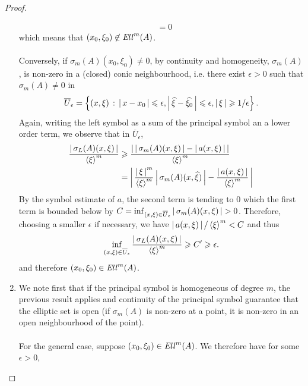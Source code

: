 \documentclass[12pt]{article}
\begin{document}
\begin{proof}
\begin{enumerate}
\begin{align*}
            & = 0
        \end{align*}
        which means that $(x_0, \xi_0) \not \in \Ell^m(A)$. \\
        \\
        Conversely, if $\sigma_m(A)(x_0, \xi_0) \neq 0$, by continuity and homogeneity,  $\sigma_m(A)$, is non-zero in a (closed) conic neighbourhood, i.e. there exist $\epsilon > 0$ such that $\sigma_m(A) \neq 0$ in 
        \begin{align*}
            \overline{U}_\epsilon = \set{(x, \xi) \wh \abs{x - x_0} \leq \epsilon, \abs{\widehat{\xi} - \widehat{\xi_0}}\leq \epsilon, \abs{\xi} \geq 1/ \epsilon}. 
        \end{align*}
        Again, writing the left symbol as a sum of the principal symbol an a lower order term, we observe that in $\overline{U}_\epsilon$, 
        \begin{align*}
            \frac{\abs{\sigma_L(A)(x, \xi)} }{\sym[\xi]^m}
            & \geq \frac{\abs{\abs{\sigma_m(A)(x, \xi)} - \abs{a(x, \xi)}}}{\sym[\xi]^m} \\
            & = \abs{\frac{\abs{\xi}^m}{\sym[\xi]^m} \abs{\sigma_m(A)(x, \widehat{\xi})} - \frac{\abs{a(x, \xi)}}{\sym[\xi]^m}} \\
        \end{align*}
        By the symbol estimate of $a$, the second term is tending to $0$ which the first term is bounded below by $C = \inf_{(x, \xi) \in \overline{U}_\epsilon} \abs{\sigma_m(A)(x, \xi)} > 0$. Therefore, choosing a smaller $\epsilon$ if necessary, we have $\abs{a(x, \xi)} / \sym[\xi]^m < C$ and thus 
        \begin{align*}
            \inf_{(x, \xi) \in \overline{U}_\epsilon} \frac{\abs{\sigma_L(A)(x, \xi)} }{\sym[\xi]^m}
            \geq C' 
            \geq \epsilon. 
        \end{align*}
        and therefore $(x_0, \xi_0) \in \Ell^m(A)$. 
        
        \item We note first that if the principal symbol is homogeneous of degree $m$, the previous result applies and continuity of the principal symbol guarantee that the elliptic set is open (if $\sigma_m(A)$ is non-zero at a point, it is non-zero in an open neighbourhood of the point). \\
        \\
        For the general case, suppose $(x_0, \xi_0) \in \Ell^m(A)$. We therefore have for some $\epsilon > 0$, 
        

\end{enumerate}
\end{proof}
\end{document}
